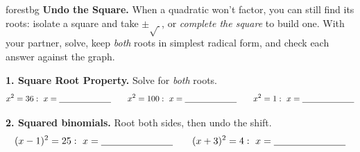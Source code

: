 \documentclass[10pt]{article}
\begin{document}

\vspace{0.08in}

\begin{headlinebox}{forestbg}
\small\textbf{Undo the Square.} When a quadratic won't factor, you can still find its roots: isolate a
square and take $\pm\sqrt{\ }$, or \emph{complete the square} to build one. With your partner, solve, keep
\emph{both} roots in simplest radical form, and check each answer against the graph.
\end{headlinebox}

\vspace{0.06in}

\begin{tcolorbox}[colback=white, colframe=black!40, title=\textbf{Tier R --- Remediate},
    fonttitle=\bfseries, arc=1.5mm, left=3mm, right=3mm, top=2mm, bottom=2mm, breakable]
\textbf{1. Square Root Property.} Solve for \emph{both} roots.
\[
  x^2=36:\ x=\blank{2.2cm} \qquad x^2=100:\ x=\blank{2.2cm} \qquad x^2=1:\ x=\blank{2.2cm}
\]

\textbf{2. Squared binomials.} Root both sides, then undo the shift.
\[
  (x-1)^2=25:\ x=\blank{2.6cm} \qquad (x+3)^2=4:\ x=\blank{2.6cm}
\]


\end{tcolorbox}
\end{document}
